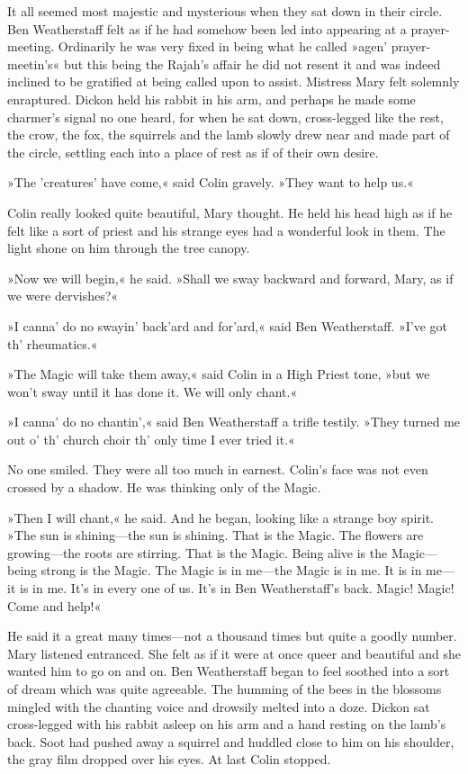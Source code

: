 It all seemed most majestic and mysterious when they sat down in their circle. Ben Weatherstaff felt as if he had somehow been led into appearing at a prayer-meeting. Ordinarily he was very fixed in being what he called »agen' prayer-meetin's« but this being the Rajah's affair he did not resent it and was indeed inclined to be gratified at being called upon to assist. Mistress Mary felt solemnly enraptured. Dickon held his rabbit in his arm, and perhaps he made some charmer's signal no one heard, for when he sat down, cross-legged like the rest, the crow, the fox, the squirrels and the lamb slowly drew near and made part of the circle, settling each into a place of rest as if of their own desire.

»The 'creatures' have come,« said Colin gravely. »They want to help us.«

Colin really looked quite beautiful, Mary thought. He held his head high as if he felt like a sort of priest and his strange eyes had a wonderful look in them. The light shone on him through the tree canopy.

»Now we will begin,« he said. »Shall we sway backward and forward, Mary, as if we were dervishes?«

»I canna' do no swayin' back'ard and for'ard,« said Ben Weatherstaff. »I've got th' rheumatics.«

»The Magic will take them away,« said Colin in a High Priest tone, »but we won't sway until it has done it. We will only chant.«

»I canna' do no chantin',« said Ben Weatherstaff a trifle testily. »They turned me out o' th' church choir th' only time I ever tried it.«

No one smiled. They were all too much in earnest. Colin's face was not even crossed by a shadow. He was thinking only of the Magic.

»Then I will chant,« he said. And he began, looking like a strange boy spirit. »The sun is shining—the sun is shining. That is the Magic. The flowers are growing—the roots are stirring. That is the Magic. Being alive is the Magic—being strong is the Magic. The Magic is in me—the Magic is in me. It is in me—it is in me. It's in every one of us. It's in Ben Weatherstaff's back. Magic! Magic! Come and help!«

He said it a great many times—not a thousand times but quite a goodly number. Mary listened entranced. She felt as if it were at once queer and beautiful and she wanted him to go on and on. Ben Weatherstaff began to feel soothed into a sort of dream which was quite agreeable. The humming of the bees in the blossoms mingled with the chanting voice and drowsily melted into a doze. Dickon sat cross-legged with his rabbit asleep on his arm and a hand resting on the lamb's back. Soot had pushed away a squirrel and huddled close to him on his shoulder, the gray film dropped over his eyes. At last Colin stopped.

